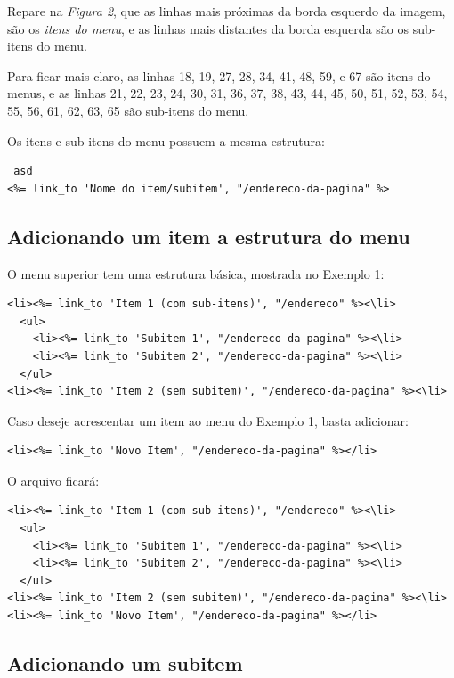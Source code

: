 Repare na \emph{Figura 2}, que as linhas mais próximas da borda esquerdo da imagem, são os \emph{itens do menu}, e as linhas mais distantes da borda esquerda são os sub-itens do menu.

Para ficar mais claro, as linhas 18, 19, 27, 28, 34, 41, 48, 59, e 67 são itens do menus, e as linhas 21, 22, 23, 24, 30, 31, 36, 37, 38, 43, 44, 45, 50, 51, 52, 53, 54, 55, 56, 61, 62, 63, 65 são sub-itens do menu.

Os itens e sub-itens do menu possuem a mesma estrutura:

\begin{verbatim}
 asd
<%= link_to 'Nome do item/subitem', "/endereco-da-pagina" %>
\end{verbatim}

\subsection{Adicionando um item a estrutura do menu}

O menu superior tem uma estrutura básica, mostrada no Exemplo 1:

\begin{verbatim}
<li><%= link_to 'Item 1 (com sub-itens)', "/endereco" %><\li>
  <ul>
    <li><%= link_to 'Subitem 1', "/endereco-da-pagina" %><\li>
    <li><%= link_to 'Subitem 2', "/endereco-da-pagina" %><\li>
  </ul>
<li><%= link_to 'Item 2 (sem subitem)', "/endereco-da-pagina" %><\li>
\end{verbatim}

Caso deseje acrescentar um item ao menu do Exemplo 1, basta adicionar:

\begin{verbatim}
<li><%= link_to 'Novo Item', "/endereco-da-pagina" %></li>
\end{verbatim}

O arquivo ficará:

\begin{verbatim}
<li><%= link_to 'Item 1 (com sub-itens)', "/endereco" %><\li>
  <ul>
    <li><%= link_to 'Subitem 1', "/endereco-da-pagina" %><\li>
    <li><%= link_to 'Subitem 2', "/endereco-da-pagina" %><\li>
  </ul>
<li><%= link_to 'Item 2 (sem subitem)', "/endereco-da-pagina" %><\li>
<li><%= link_to 'Novo Item', "/endereco-da-pagina" %></li>
\end{verbatim}

\subsection{Adicionando um subitem}

